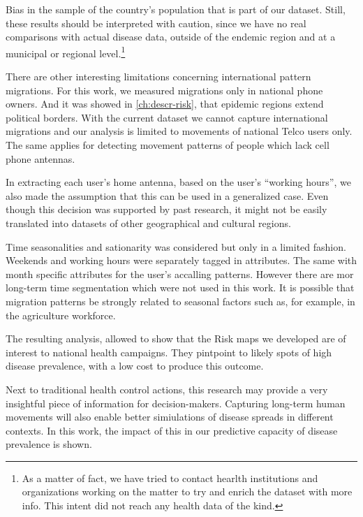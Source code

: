 Bias in the sample of the country's population that is part of our dataset.
Still, these results should be interpreted with caution, since we have no real comparisons with actual disease data, outside of the endemic region and at a municipal or regional level.\footnote{As a matter of fact, we have tried to contact hearlth institutions and organizations working on the matter to try and enrich the dataset with more info. This intent did not reach any health data of the kind.}

There are other interesting limitations concerning international pattern migrations.
For this work, we measured migrations only in national phone owners.
And it was showed in \cref{ch:descr-risk}, that  epidemic regions extend political borders.
With the current dataset we cannot capture international migrations and our analysis is limited to movements of national Telco users only.
The same applies for detecting movement patterns of people which lack cell phone antennas.

In extracting each user's home antenna, based on the user's ``working hours'', we also made the assumption that this can be used in a generalized case.
Even though this decision was supported by past research, it might not be easily translated into datasets of other geographical and cultural regions.

Time seasonalities and sationarity was considered but only in a limited fashion.
Weekends and working hours were separately tagged in attributes.
The same with month specific attributes for the user's accalling patterns.
However there are mor long-term time segmentation which were not used in this work.
It is possible that migration patterns be strongly related to seasonal factors such as, for example, in the agriculture workforce.



The resulting analysis, allowed to show that the Risk maps we developed are of interest to national health campaigns.
They pintpoint to likely spots of high disease prevalence, with a low cost to produce this outcome.

Next to traditional health control actions, this research may provide a very insightful piece of information for decision-makers.
Capturing long-term human movements will also enable better simiulations of disease spreads in different contexts.
In this work, the impact of this in our predictive capacity of disease prevalence is shown.






